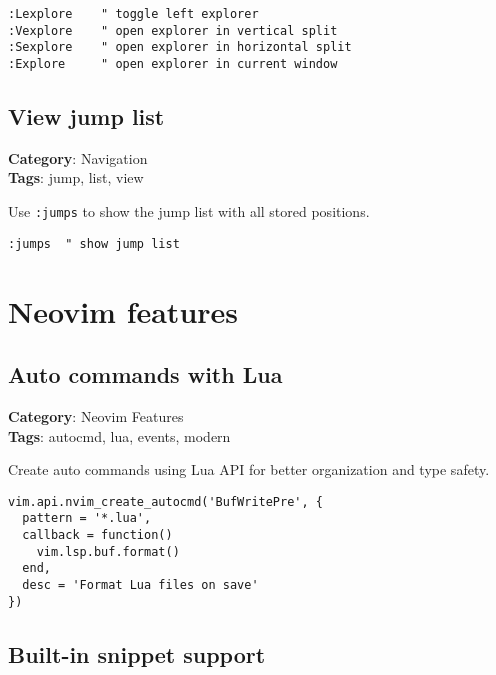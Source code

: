 {{{{{{{{{{\begin{Exa*}{}
\begin{Verbatim}[fontsize=\footnotesize, breaklines, breakanywhere]
:Lexplore    " toggle left explorer
:Vexplore    " open explorer in vertical split
:Sexplore    " open explorer in horizontal split
:Explore     " open explorer in current window
\end{Verbatim}
\end{Exa*}

\section{View jump list}

\textbf{Category}: Navigation\\ \textbf{Tags}: jump, list, view
\vspace{0.5cm}

Use {\footnotesize \Verb§:jumps§} to show the jump list with all stored positions.

\begin{Exa*}{}
\begin{Verbatim}[fontsize=\footnotesize, breaklines, breakanywhere]
:jumps  " show jump list
\end{Verbatim}
\end{Exa*}

\chapter{Neovim features}
\section{Auto commands with Lua}

\textbf{Category}: Neovim Features\\ \textbf{Tags}: autocmd, lua, events, modern
\vspace{0.5cm}

Create auto commands using Lua API for better organization and type safety.

\begin{Exa*}{}
\begin{Verbatim}[fontsize=\footnotesize, breaklines, breakanywhere]
vim.api.nvim_create_autocmd('BufWritePre', {
  pattern = '*.lua',
  callback = function()
    vim.lsp.buf.format()
  end,
  desc = 'Format Lua files on save'
})
\end{Verbatim}
\end{Exa*}

\section{Built-in snippet support}

}}}}}}}}}}
